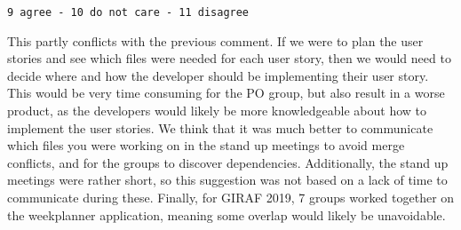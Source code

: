\begin{center}
    \texttt{9 agree - 10 do not care - 11 disagree}
\end{center}
This partly conflicts with the previous comment. 
If we were to plan the user stories and see which files were needed for each user story, then we would need to decide where and how the developer should be implementing their user story. 
This would be very time consuming for the PO group, but also result in a worse product, as the developers would likely be more knowledgeable about how to implement the user stories.
We think that it was much better to communicate which files you were working on in the stand up meetings to avoid merge conflicts, and for the groups to discover dependencies.
Additionally, the stand up meetings were rather short, so this suggestion was not based on a lack of time to communicate during these.
Finally, for GIRAF 2019, 7 groups worked together on the weekplanner application, meaning some overlap would likely be unavoidable.

